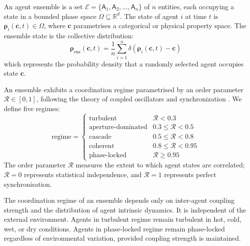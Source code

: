 \documentclass[11pt,twocolumn,a4paper]{article}
\newcommand{\R}{\mathbb{R}}
\newcommand{\Agent}{\mathsf{A}}
\newcommand{\State}{\boldsymbol{\rho}}
\newcommand{\Coord}{\mathcal{R}}
\begin{document}
\begin{definition}
An agent ensemble is a set $\mathcal{E} = \{\Agent_1, \Agent_2, \ldots, \Agent_n\}$ of $n$ entities, each occupying a state in a bounded phase space $\Omega \subseteq \R^d$. The state of agent $i$ at time $t$ is $\State_i(\mathbf{c}, t) \in \Omega$, where $\mathbf{c}$ parametrises a categorical or physical property space. The ensemble state is the collective distribution:
\begin{equation}
\State_{\mathrm{ens}}(\mathbf{c}, t) = \frac{1}{n}\sum_{i=1}^n \delta(\State_i(\mathbf{c}, t) - \mathbf{c})
\label{eq:ensemble_state}
\end{equation}
which represents the probability density that a randomly selected agent occupies state $\mathbf{c}$.
\end{definition}

\begin{definition}
An ensemble exhibits a coordination regime parametrised by an order parameter $\Coord \in [0,1]$, following the theory of coupled oscillators and synchronization \cite{kuramoto1984chemical,strogatz2000sync}. We define five regimes:
\begin{equation}
\text{regime} = \begin{cases}
\text{turbulent} & \Coord < 0.3 \\
\text{aperture-dominated} & 0.3 \le \Coord < 0.5 \\
\text{cascade} & 0.5 \le \Coord < 0.8 \\
\text{coherent} & 0.8 \le \Coord < 0.95 \\
\text{phase-locked} & \Coord \ge 0.95
\end{cases}
\label{eq:regimes}
\end{equation}
The order parameter $\Coord$ measures the extent to which agent states are correlated; $\Coord = 0$ represents statistical independence, and $\Coord = 1$ represents perfect synchronisation.
\end{definition}

\begin{principle}
The coordination regime of an ensemble depends only on inter-agent coupling strength and the distribution of agent intrinsic dynamics. It is independent of the external environment. Agents in turbulent regime remain turbulent in hot, cold, wet, or dry conditions. Agents in phase-locked regime remain phase-locked regardless of environmental variation, provided coupling strength is maintained.
\end{principle}
\end{document}
